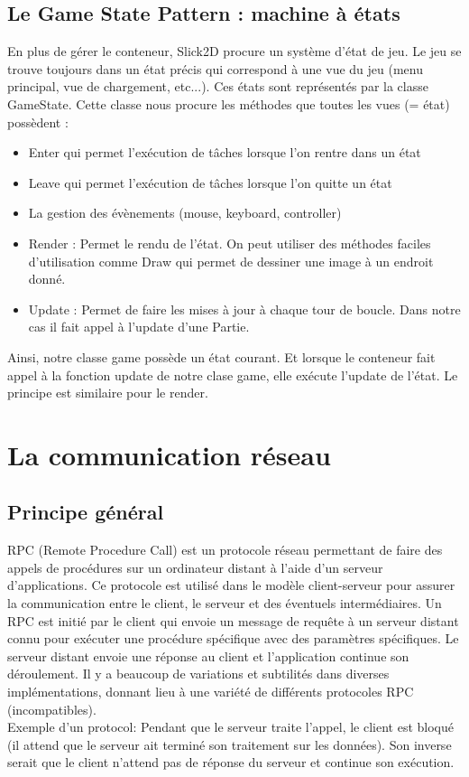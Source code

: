 \documentclass{report}
\begin{document}
\section{Le Game State Pattern : machine à états}\label{gameStatePattern1}
En plus de gérer le conteneur, Slick2D procure un système d'état de jeu. Le jeu se trouve toujours dans un état précis qui correspond à une vue du jeu (menu principal, vue de chargement, etc...). Ces états sont représentés par la classe GameState. Cette classe nous procure les méthodes que toutes les vues (= état) possèdent :
\begin{itemize}
\item Enter qui permet l'exécution de tâches lorsque l'on rentre dans un état
\item Leave qui permet l'exécution de tâches lorsque l'on quitte un état
\item La gestion des évènements (mouse, keyboard, controller)
\item Render : Permet le rendu de l'état. On peut utiliser des méthodes faciles d'utilisation comme Draw qui permet de dessiner une image à un endroit donné.
\item Update : Permet de faire les mises à jour à chaque tour de boucle. Dans notre cas il fait appel à l'update d'une Partie.
\end{itemize}
Ainsi, notre classe game possède un état courant. Et lorsque le conteneur fait appel à la fonction update de notre clase game, elle exécute l'update de l'état. Le principe est similaire pour le render.

\chapter{La communication réseau}
\section{Principe général}
RPC (Remote Procedure Call) est un protocole réseau permettant de faire des appels de procédures sur un ordinateur distant à l'aide d'un serveur d'applications. Ce protocole est utilisé dans le modèle client-serveur pour assurer la communication entre le client, le serveur et des éventuels intermédiaires.
Un RPC est initié par le client qui envoie un message de requête à un serveur distant connu pour exécuter une procédure spécifique avec des paramètres spécifiques. Le serveur distant envoie une réponse au client et l'application continue son déroulement. Il y a beaucoup de variations et subtilités dans diverses implémentations, donnant lieu à une variété de différents protocoles RPC (incompatibles).\\
Exemple d'un protocol: Pendant que le serveur traite l'appel, le client est bloqué (il attend que le serveur ait terminé son traitement sur les données). Son inverse serait que le client n'attend pas de réponse du serveur et continue son exécution.
\end{document}
